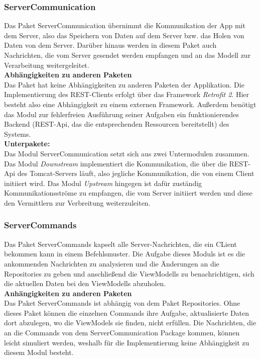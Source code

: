 \documentclass[11pt,a4paper]{article}
\begin{document}
\subsubsection{ServerCommunication}
Das Paket ServerCommunication übernimmt die Kommunikation der App mit dem Server, also das Speichern von Daten auf dem Server bzw. das Holen von Daten von dem Server. Darüber hinaus werden in diesem Paket auch Nachrichten, die vom Server gesendet werden empfangen und an das Modell zur Verarbeitung weitergeleitet.\\

\textbf{Abhängigkeiten zu anderen Paketen}\\
Das Paket hat keine Abhängigkeiten zu anderen Paketen der Applikation. Die Implementierung des REST-Clients erfolgt über das Framework \textit{Retrofit 2}. Hier besteht also eine Abhängigkeit zu einem externen Framework. Außerdem benötigt das Modul zur fehlerfreien Ausführung seiner Aufgaben ein funktionierendes Backend (REST-Api, das die entsprechenden Ressourcen bereitstellt) des Systems.\\

\textbf{Unterpakete:}\\
Das Modul ServerCommunication setzt sich aus zwei Untermodulen zusammen. Das Modul \textit{Downstream} implementiert die Kommunikation, die über die REST-Api des Tomcat-Servers läuft, also jegliche Kommunikation, die von einem Client initiiert wird. Das Modul \textit{Upstream} hingegen ist dafür zuständig Kommunikationsströme zu empfangen, die vom Server initiiert werden und diese den Vermittlern zur Verbreitung weiterzuleiten.\\

\subsubsection{ServerCommands}
Das Paket ServerCommands kapselt alle Server-Nachrichten, die ein CLient bekommen kann in einem Befehlsmuster. Die Aufgabe dieses Moduls ist es die ankommenden Nachrichten zu analysieren und die Änderungen an die Repositories zu geben und anschließend die ViewModells zu benachrichtigen, sich die aktuellen Daten bei den ViewModells abzuholen.\\

\textbf{Anhängigkeiten zu anderen Paketen}\\
Das Paket ServerCommands ist abhängig von dem Paket Repositories. Ohne dieses Paket können die einzelnen Commands ihre Aufgabe, aktualisierte Daten dort abzulegen, wo die ViewModels sie finden, nicht erfüllen. Die Nachrichten, die an die Commands von dem ServerCommunication Package kommen, können leicht simuliert werden, weshalb für die Implementierung keine Abhängigkeit zu diesem Modul besteht.\\
\end{document}
